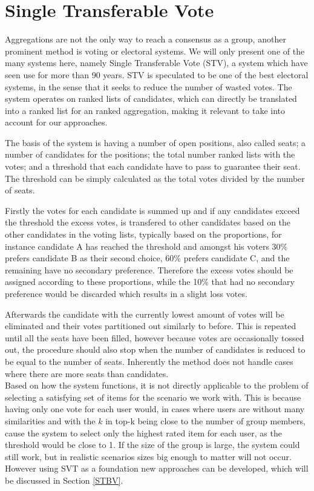 \section{Single Transferable Vote} \label{sec:stv}
Aggregations are not the only way to reach a consensus as a group, another prominent method is voting or electoral systems. We will only present one of the many systems here, namely Single Transferable Vote (STV), a system which have seen use for more than 90 years. \cite{stvireland}
STV is speculated to be one of the best electoral systems, in the sense that it seeks to reduce the number of wasted votes. The system operates on ranked lists of candidates, which can directly be translated into a ranked list for an ranked aggregation, making it relevant to take into account for our approaches.

The basis of the system is having a number of open positions, also called seats; a number of candidates for the positions; the total number ranked lists with the votes; and a threshold that each candidate have to pass to guarantee their seat. The threshold can be simply calculated as the total votes divided by the number of seats. \cite{stv}

Firstly the votes for each candidate is summed up and if any candidates exceed the threshold the excess votes, is transfered to other candidates based on the other candidates in the voting lists, typically based on the proportions, for instance candidate A has reached the threshold and amongst his voters 30\% prefers candidate B as their second choice, 60\% prefers candidate C, and the remaining have no secondary preference. Therefore the excess votes should be assigned according to these proportions, while the 10\% that had no secondary preference would be discarded which results in a slight loss votes.

Afterwards the candidate with the currently lowest amount of votes will be eliminated and their votes partitioned out similarly to before. This is repeated until all the seats have been filled, however because votes are occasionally tossed out, the procedure should also stop when the number of candidates is reduced to be equal to the number of seats. Inherently the method does not handle cases where there are more seats than candidates.\\

Based on how the system functions, it is not directly applicable to the problem of selecting a satisfying set of items for the scenario we work with. This is because having only one vote for each user would, in cases where users are without many similarities and with the $k$ in top-k being close to the number of group members, cause the system to select only the highest rated item for each user, as the threshold would be close to 1. If the size of the group is large, the system could still work, but in realistic scenarios sizes big enough to matter will not occur. However using SVT as a foundation new approaches can be developed, which will be discussed in Section \ref{STBV}.